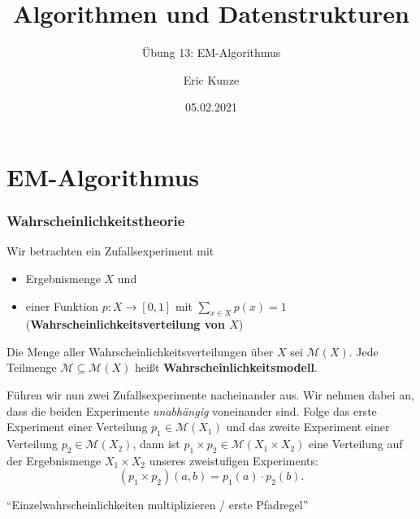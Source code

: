 \documentclass{beamer}
\begin{document}
	
	\title{Algorithmen und Datenstrukturen}
	\subtitle{Übung 13: EM-Algorithmus}
	\author{Eric Kunze}
	\date{05.02.2021}

	\maketitle


\section{EM-Algorithmus}

\begin{frame} \frametitle{Wahrscheinlichkeitstheorie}
	\justifying \footnotesize
	Wir betrachten ein Zufallsexperiment mit
	\begin{itemize}
		\item Ergebnismenge $X$ und
		\item einer Funktion $p \colon X \to [0,1]$ mit $\sum_{x \in X} p(x) = 1$ (\textbf{Wahrscheinlichkeitsverteilung von $X$})
	\end{itemize}
	Die Menge aller Wahrscheinlichkeitsverteilungen über $X$ sei $\mathcal{M}(X)$. Jede Teilmenge $\mathcal{M} \subseteq \mathcal{M}(X)$ heißt \textbf{Wahrscheinlichkeitsmodell}.
	
	Führen wir nun zwei Zufallsexperimente nacheinander aus. Wir nehmen dabei an, dass die beiden Experimente \textit{unabhängig} voneinander sind. Folge das erste Experiment einer Verteilung $p_1 \in \mathcal{M}(X_1)$ und das zweite Experiment einer Verteilung $p_2 \in \mathcal{M}(X_2)$, dann ist $p_1 \times p_2 \in \mathcal{M}(X_1 \times X_2)$ eine Verteilung auf der Ergebnismenge $X_1 \times X_2$ unseres zweistufigen Experiments:
	\begin{equation*}
		(p_1 \times p_2)(a,b) = p_1(a) \cdot p_2(b) .
	\end{equation*}
	\begin{center}
		\enquote{Einzelwahrscheinlichkeiten multiplizieren / erste Pfadregel}
	\end{center}
\end{frame}
\end{document}
